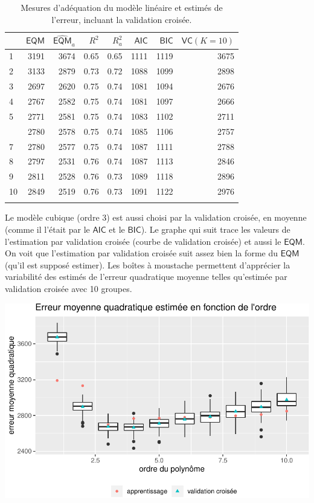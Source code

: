 \documentclass[
  11pt,
  letterpaper,
]{book}
\theoremstyle{definition}
\theoremstyle{definition}
\theoremstyle{definition}
\theoremstyle{remark}
\begin{document}
\begin{table}

\caption{\label{tab:02-table2}Mesures d'adéquation du modèle linéaire et estimés de l'erreur, incluant la validation croisée.}
\centering
\begin{tabular}[t]{lrrrrrrr}
\toprule{}
  & \(\mathsf{EQM}\) & \(\widehat{\mathsf{EQM}}_a\) & \(R^2\) & \(R^2_a\) & \(\mathsf{AIC}\) & \(\mathsf{BIC}\) & \(\mathsf{VC} (K=10)\)\\
\midrule{}
1 & 3191 & 3674 & 0.65 & 0.65 & 1111 & 1119 & 3675\\
2 & 3133 & 2879 & 0.73 & 0.72 & 1088 & 1099 & 2898\\
3 & 2697 & 2620 & 0.75 & 0.74 & 1081 & 1094 & 2676\\
4 & 2767 & 2582 & 0.75 & 0.74 & 1081 & 1097 & 2666\\
5 & 2771 & 2581 & 0.75 & 0.74 & 1083 & 1102 & 2711\\
\addlinespace
6 & 2780 & 2578 & 0.75 & 0.74 & 1085 & 1106 & 2757\\
7 & 2780 & 2577 & 0.75 & 0.74 & 1087 & 1111 & 2788\\
8 & 2797 & 2531 & 0.76 & 0.74 & 1087 & 1113 & 2846\\
9 & 2811 & 2528 & 0.76 & 0.73 & 1089 & 1118 & 2896\\
10 & 2849 & 2519 & 0.76 & 0.73 & 1091 & 1122 & 2976\\
\bottomrule{}
\end{tabular}
\end{table}

Le modèle cubique (ordre 3) est aussi choisi par la validation croisée, en moyenne (comme il l'était par le \(\mathsf{AIC}\) et le \(\mathsf{BIC}\)). Le graphe qui suit trace les valeurs de l'estimation par validation croisée (courbe de validation croisée) et aussi le \(\mathsf{EQM}\). On voit que l'estimation par validation croisée suit assez bien la forme du \(\mathsf{EQM}\) (qu'il est supposé estimer). Les boîtes à moustache permettent d'apprécier la variabilité des estimés de l'erreur quadratique moyenne telles qu'estimée par validation croisée avec 10 groupes.

\begin{center}\includegraphics[width=0.7\linewidth]{MATH60602_files/figure-latex/plotcv-1} \end{center}
\end{document}
